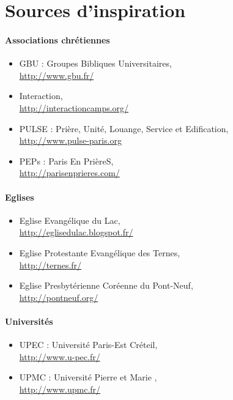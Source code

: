 \section{Sources d'inspiration}

	\paragraph{Associations chrétiennes}
	
	\begin{itemize}
	\item GBU : Groupes Bibliques Universitaires,\\
		\url{http://www.gbu.fr/}
	\item Interaction,\\
		\url{http://interactioncamps.org/}
	\item PULSE : Prière, Unité, Louange, Service et Edification,\\
		\url{http://www.pulse-paris.org}
	\item PEPs : Paris En PrièreS,\\
		\url{http://parisenprieres.com/}
	\end{itemize}
	
	\paragraph{Eglises}
	
	\begin{itemize}
	\item Eglise Evangélique du Lac,\\
		\url{http://eglisedulac.blogspot.fr/}
	\item Eglise Protestante Evangélique des Ternes,\\
		\url{http://ternes.fr/} %
	\item Eglise Presbytérienne Coréenne du Pont-Neuf,\\
		\url{http://pontneuf.org/}
	\end{itemize}
	
	\paragraph{Universités}
	
	\begin{itemize}
    \item UPEC : Université Paris-Est Créteil,\\
        \url{http://www.u-pec.fr/}
	\item UPMC : Université Pierre et Marie ,\\
        \url{http://www.upmc.fr/}
	\end{itemize}
	
	
